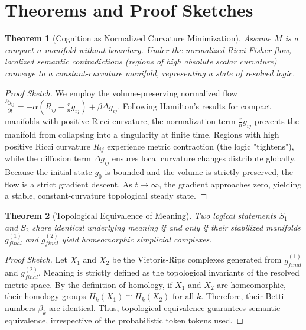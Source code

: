 \documentclass[11pt,a4paper,twocolumn]{article}
\newtheorem{theorem}{Theorem}[section]
\begin{document}
\section{Theorems and Proof Sketches}

\begin{theorem}[Cognition as Normalized Curvature Minimization]
Assume $M$ is a compact $n$-manifold without boundary. Under the normalized Ricci-Fisher flow, localized semantic contradictions (regions of high absolute scalar curvature) converge to a constant-curvature manifold, representing a state of resolved logic.
\end{theorem}

\begin{proof}[Proof Sketch]
We employ the volume-preserving normalized flow $\frac{\partial g_{ij}}{\partial t} = -\alpha (R_{ij} - \frac{r}{n} g_{ij}) + \beta \Delta g_{ij}$. Following Hamilton’s results for compact manifolds with positive Ricci curvature, the normalization term $\frac{r}{n} g_{ij}$ prevents the manifold from collapsing into a singularity at finite time. Regions with high positive Ricci curvature $R_{ij}$ experience metric contraction (the logic "tightens"), while the diffusion term $\Delta g_{ij}$ ensures local curvature changes distribute globally. Because the initial state $g_0$ is bounded and the volume is strictly preserved, the flow is a strict gradient descent. As $t \to \infty$, the gradient approaches zero, yielding a stable, constant-curvature topological steady state.
\end{proof}

\begin{theorem}[Topological Equivalence of Meaning]
Two logical statements $S_1$ and $S_2$ share identical underlying meaning if and only if their stabilized manifolds $g_{final}^{(1)}$ and $g_{final}^{(2)}$ yield homeomorphic simplicial complexes.
\end{theorem}

\begin{proof}[Proof Sketch]
Let $X_1$ and $X_2$ be the Vietoris-Rips complexes generated from $g_{final}^{(1)}$ and $g_{final}^{(2)}$. Meaning is strictly defined as the topological invariants of the resolved metric space. By the definition of homology, if $X_1$ and $X_2$ are homeomorphic, their homology groups $H_k(X_1) \cong H_k(X_2)$ for all $k$. Therefore, their Betti numbers $\beta_k$ are identical. Thus, topological equivalence guarantees semantic equivalence, irrespective of the probabilistic token tokens used.
\end{proof}
\end{document}
